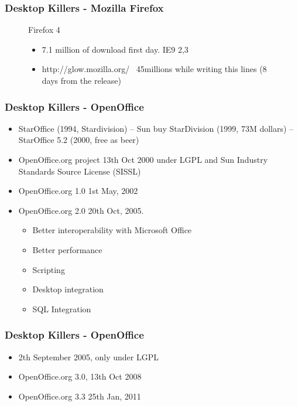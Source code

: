 \documentclass{beamer}
\begin{document}
\begin{frame}
\frametitle{Desktop Killers - Mozilla Firefox}
\begin{figure}
\item Firefox 4
	\begin{itemize}
	\item 7.1 million of download first day. IE9 2,3
	\item http://glow.mozilla.org/  ~45millions while writing this lines (8 days from the release)
	\end{itemize} 
\end{figure}
\end{frame}

\begin{frame}
\frametitle{Desktop Killers - OpenOffice}

\begin{itemize}
\item StarOffice (1994, Stardivision) -- Sun buy StarDivision (1999, 73M dollars) -- StarOffice 5.2 (2000, free as beer) 
\item OpenOffice.org project 13th Oct 2000 under LGPL and Sun Industry Standards Source License (SISSL)
\item OpenOffice.org 1.0 1st May, 2002
\item OpenOffice.org 2.0 20th Oct, 2005. 
	\begin{itemize}
	\item Better interoperability with Microsoft Office
	\item Better performance
	\item Scripting
	\item Desktop integration
	\item SQL Integration
	\end{itemize}
\end{itemize}

\end{frame}


\begin{frame}
\frametitle{Desktop Killers - OpenOffice}

\begin{itemize}
\item 2th September 2005, only under LGPL
\item OpenOffice.org 3.0, 13th Oct 2008
\item OpenOffice.org 3.3 25th Jan, 2011
\end{itemize}

\end{frame}
\end{document}
